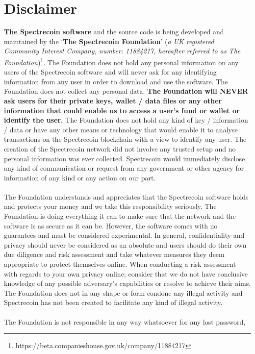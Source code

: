 \section{Disclaimer}
\textbf{The Spectrecoin software} and the source code is being developed 
and maintained by the ‘\textbf{The Spectrecoin Foundation}’
(\textit{a UK registered Community Interest Company, number: 11884217, hereafter
referred to as The Foundation})\footnote{https://beta.companieshouse.gov.uk/company/11884217}.
The Foundation does not hold any personal information on any users of the
Spectrecoin software and will never ask for any identifying information
from any user in order to download and use the software. The Foundation
does not collect any personal data. \textbf{The Foundation will NEVER ask
users for their private keys, wallet / data files or any other information 
that could enable us to access a user’s fund or wallet or identify the
user.} The Foundation does not hold any kind of key / information / data
or have any other means or technology that would enable it to analyse
transactions on the Spectrecoin blockchain with a view to identify any
user. The creation of the Spectrecoin network did not involve any trusted
setup and no personal information was ever collected. Spectrecoin would
immediately disclose any kind of communication or request from any
government or other agency for information of any kind or any action on
our part.
\\
\\
The Foundation understands and appreciates that the Spectrecoin software 
holds and protects your money and we take this responsibility seriously. The
Foundation is doing everything it can to make sure that the network and
the software is as secure as it can be. However, the software comes with
no guarantees and must be considered experimental. In general, confidentiality
and privacy should never be considered as an absolute and users should do their
own due diligence and risk assessment and take whatever measures they deem
appropriate to protect themselves online. When conducting a risk assessment
with regards to your own privacy online; consider that we do not have
conclusive knowledge of any possible adversary’s capabilities or resolve to
achieve their aims. The Foundation does not in any shape or form condone any
illegal activity and Spectrecoin has not been created to facilitate any kind
of illegal activity.
\\
\\
The Foundation is not responsible in any way whatsoever for any lost password,

